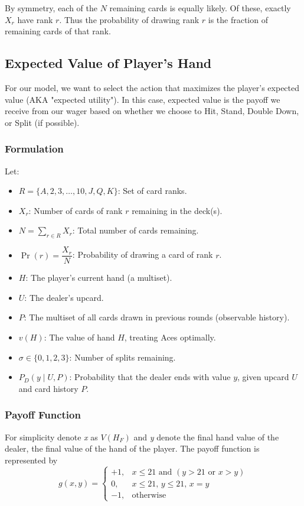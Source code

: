 \documentclass[12pt,a4paper]{cibb}
\begin{document}
By symmetry, each of the $N$ remaining cards is equally likely. Of these, exactly $X_r$ have rank $r$. 
Thus the probability of drawing rank $r$ is the fraction of remaining cards of that rank. 

\subsection{Expected Value of Player's Hand}
\label{sec:Expected Value}
For our model, we want to select the action that maximizes the player's expected value (AKA "expected utility").
In this case, expected value is the payoff we receive from our wager based on whether we choose to Hit, Stand, Double Down, or Split (if possible). 

\subsubsection{Formulation}

Let:
\begin{itemize}
    \item \( R = \{A, 2, 3, \dots, 10, J, Q, K\} \): Set of card ranks.
    \item \( X_r \): Number of cards of rank \(r\) remaining in the deck(s). 
    \item \( N = \sum_{r \in R} X_r \): Total number of cards remaining. 
    \item \( \Pr(r) = \dfrac{X_r}{N} \): Probability of drawing a card of rank \(r\). 
    \item \( H \): The player's current hand (a multiset).
    \item \( U \): The dealer's upcard.
    \item \( P \): The multiset of all cards drawn in previous rounds (observable history).
    \item \( v(H) \): The value of hand \(H\), treating Aces optimally.
    \item \( σ \in \{0,1,2,3\} \): Number of splits remaining.
    \item \( P_D(y \mid U, P) \): Probability that the dealer ends with value \(y\), given upcard \(U\) and card history \(P\).
\end{itemize}

\subsubsection*{Payoff Function}
For simplicity denote \textit{x} as \( V(H_F)\) and \textit{y} denote the final hand value of the dealer, the final value of the hand of the player. 
The payoff function is represented by
\[
g(x, y) =
\begin{cases}
+1, & x \leq 21 \text{ and } (y > 21 \text{ or } x > y) \\
0, & x \leq 21,\, y \leq 21,\, x = y \\
-1, & \text{otherwise}
\end{cases}
\]
\end{document}
